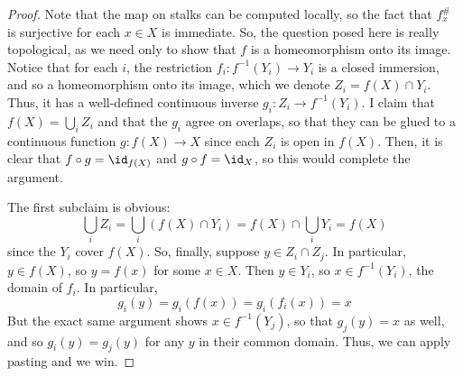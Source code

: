 \begin{proof}
	Note that the map on stalks can be computed locally, so the fact that $f^\#_x$ is surjective for each $x \in X$ is immediate. So, the question posed here is really topological, as we need only to show that $f$ is a homeomorphism onto its image. Notice that for each $i$, the restriction $f_i : f^{-1}(Y_i) \to Y_i$ is a closed immersion, and so a homeomorphism onto its image, which we denote $Z_i = f(X) \cap Y_i$. Thus, it has a well-defined continuous inverse $g_i : Z_i \to f^{-1}(Y_i)$. I claim that $f(X) = \bigcup_i Z_i$ and that the $g_i$ agree on overlaps, so that they can be glued to a continuous function $g : f(X) \to X$ since each $Z_i$ is open in $f(X)$. Then, it is clear that $f \circ g = \id_{f(X)}$ and $g \circ f = \id_X$, so this would complete the argument.
	
	The first subclaim is obvious:
	\[ \bigcup_i Z_i = \bigcup_i (f(X) \cap Y_i) = f(X) \cap \bigcup_i Y_i = f(X) \]
	since the $Y_i$ cover $f(X)$. So, finally, suppose $y \in Z_i \cap Z_j$. In particular, $y \in f(X)$, so $y = f(x)$ for some $x \in X$. Then $y \in Y_i$, so $x \in f^{-1}(Y_i)$, the domain of $f_i$. In particular,
	\[ g_i(y) = g_i(f(x)) = g_i(f_i(x)) = x \]
	But the exact same argument shows $x \in f^{-1}(Y_j)$, so that $g_j(y) = x$ as well, and so $g_i(y) = g_j(y)$ for any $y$ in their common domain. Thus, we can apply pasting and we win.
\end{proof}
